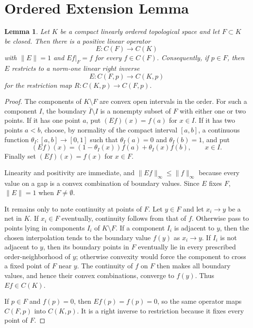 \documentclass[11pt]{article}
\newtheorem{lemma}{Lemma}
\begin{document}
\section*{Ordered Extension Lemma}

\begin{lemma}\label{lem:extension}
Let \(K\) be a compact linearly ordered topological space and let \(F\subset K\)
be closed.  Then there is a positive linear operator
\[
  E:C(F)\longrightarrow C(K)
\]
with \(\|E\|=1\) and \(E f|_F=f\) for every \(f\in C(F)\).  Consequently, if
\(p\in F\), then \(E\) restricts to a norm-one linear right inverse
\[
  E:C(F,p)\longrightarrow C(K,p)
\]
for the restriction map \(R:C(K,p)\to C(F,p)\).
\end{lemma}

\begin{proof}
The components of \(K\setminus F\) are convex open intervals in the order.
For such a component \(I\), the boundary \(\overline I\setminus I\) is a
nonempty subset of \(F\) with either one or two points.  If it has one point
\(a\), put \((Ef)(x)=f(a)\) for \(x\in I\).  If it has two points \(a<b\),
choose, by normality of the compact interval \([a,b]\), a continuous function
\(\theta_I:[a,b]\to[0,1]\) such that \(\theta_I(a)=0\) and
\(\theta_I(b)=1\), and put
\[
  (Ef)(x)=(1-\theta_I(x))f(a)+\theta_I(x)f(b),\qquad x\in I.
\]
Finally set \((Ef)(x)=f(x)\) for \(x\in F\).

Linearity and positivity are immediate, and \(\|Ef\|_\infty\le\|f\|_\infty\)
because every value on a gap is a convex combination of boundary values.
Since \(E\) fixes \(F\), \(\|E\|=1\) when \(F\ne\emptyset\).

It remains only to note continuity at points of \(F\).  Let \(y\in F\) and
let \(x_i\to y\) be a net in \(K\).  If \(x_i\in F\) eventually, continuity
follows from that of \(f\).  Otherwise pass to points lying in components
\(I_i\) of \(K\setminus F\).  If a component \(I_i\) is adjacent to \(y\), then
the chosen interpolation tends to the boundary value \(f(y)\) as
\(x_i\to y\).  If \(I_i\) is not adjacent to \(y\), then its boundary points
in \(F\) eventually lie in every prescribed order-neighborhood of \(y\);
otherwise convexity would force the component to cross a fixed point of
\(F\) near \(y\).  The continuity of \(f\) on \(F\) then makes all boundary
values, and hence their convex combinations, converge to \(f(y)\).  Thus
\(Ef\in C(K)\).

If \(p\in F\) and \(f(p)=0\), then \(Ef(p)=f(p)=0\), so the same operator maps
\(C(F,p)\) into \(C(K,p)\).  It is a right inverse to restriction because it
fixes every point of \(F\).
\end{proof}
\end{document}
